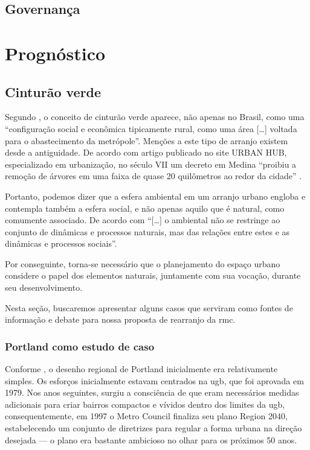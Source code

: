	\section{Governança}
	
	\chapter{Prognóstico} \label{sec:prognostico}
	
	\section{Cinturão verde}
	
	Segundo , o conceito de cinturão verde aparece, não apenas no Brasil, como uma ``configuração social e econômica tipicamente rural, como uma área [\dots] voltada para o abastecimento da metrópole''. Menções a este tipo de arranjo existem desde a antiguidade. De acordo com artigo publicado no site URBAN HUB, especializado em urbanização, no século VII um decreto em Medina ``proibiu a remoção de árvores em uma faixa de quase 20 quilômetros ao redor da cidade'' \cite{urbanhub2017a}.
	
	Portanto, podemos dizer que a esfera ambiental em um arranjo urbano engloba e contempla também a esfera social, e não apenas aquilo que é natural, como comumente associado. De acordo com
	 ``[\dots] o ambiental não se restringe ao conjunto de dinâmicas e processos naturais, mas das relações entre estes e as dinâmicas e processos sociais''.
	
	Por conseguinte, torna-se necessário que o planejamento do espaço urbano considere o papel dos elementos naturais, juntamente com sua vocação, durante seu desenvolvimento.
	
	Nesta seção, buscaremos apresentar alguns casos que serviram como fontes de informação e debate para nossa proposta de rearranjo da \glsdesc{rmc}.
	
	\subsection{Portland como estudo de caso}
	
	Conforme , o desenho regional de Portland inicialmente era relativamente simples. Os esforços inicialmente estavam centrados na \gls{ugb}, que foi aprovada em 1979. Nos anos seguintes, surgiu a consciência de que eram necessários medidas adicionais para criar bairros compactos e vívidos dentro dos limites da \gls{ugb}, consequentemente, em 1997 o Metro Council finaliza seu plano Region 2040, estabelecendo um conjunto de diretrizes para regular a forma urbana na direção desejada --- o plano era bastante ambicioso no olhar para os próximos 50 anos.
	
